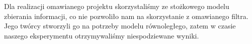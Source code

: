 \documentclass{article}
\begin{document}
Dla realizacji omawianego projektu skorzystaliśmy ze stożkowego modelu zbierania informacji, co nie pozwoliło nam na skorzystanie z omawianego filtra. Jego twórcy stworzyli go na potrzeby modelu równoległego, zatem w czasie naszego eksperymentu otrzymywaliśmy niespodziewane wyniki.




\end{document}
